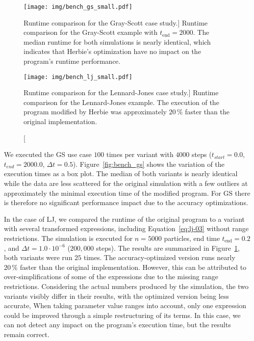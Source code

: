 \begin{figure}[tp]
	\begin{minipage}[b]{.45\textwidth}
		\centering
		\texttt{[image: img/bench\_gs\_small.pdf]}
		\caption%
		[Runtime comparison for the Gray-Scott case study.]
		{
		Runtime comparison for the Gray-Scott example with $t_\mathrm{end} = 2000$.
		The median runtime for both simulations is nearly identical, which indicates that Herbie's optimization have no impact on the program's runtime performance.
		}
		\label{fig:bench_gs}
	\end{minipage}
	\hfill
	\begin{minipage}[b]{.45\textwidth}
		\centering
                 \texttt{[image: img/bench\_lj\_small.pdf]}
		\caption%
		[Runtime comparison for the Lennard-Jones case study.]
		{
		Runtime comparison for the Lennard-Jones example.
		The execution of the program modified by Herbie was approximately $20\,\%$ faster than the original implementation.\newline
		}
		\label{fig:bench_lj}
	\end{minipage}
\end{figure}

We executed the GS use case $100$ times per variant with $4000$ steps 
($t_{start} = 0.0$, $t_{end} = 2000.0$, $\Delta{t} = 0.5$).  Figure~\ref{fig:bench_gs} 
shows the variation of the execution times as a box plot. The median of both 
variants is nearly identical while the data are less scattered for the original simulation
with a few outliers at approximately the minimal execution time of the modified 
program. For GS there is therefore no significant performance impact due to the accuracy 
optimizations.

In the case of LJ, we compared the runtime of the original program 
to a variant with several transformed expressions, including Equation~\ref{eq:lj-03} 
without range restrictions. The simulation is  
executed for $n = 5000$ particles, end time $t_\mathrm{end} = 0.2$, and 
$\Delta{t} = 1.0 \cdot 10^{-6}$ ($200,000$ steps). The results are summarized in
Figure~\ref{fig:bench_lj}, both variants were run $25$ times.
%
The accuracy-optimized version runs nearly $20\,\%$ faster than the
original implementation. However, this can be attributed to over-simplifications of
some of the expressions due to the missing range restrictions. Considering the actual numbers
produced by the simulation, the two variants visibly differ in their results, with the optimized version being less accurate, 
%
When taking parameter value ranges into account, only one expression could be improved 
through a simple restructuring of its terms. In this case, we can not
detect any impact on the program's execution time, but the results remain correct.
